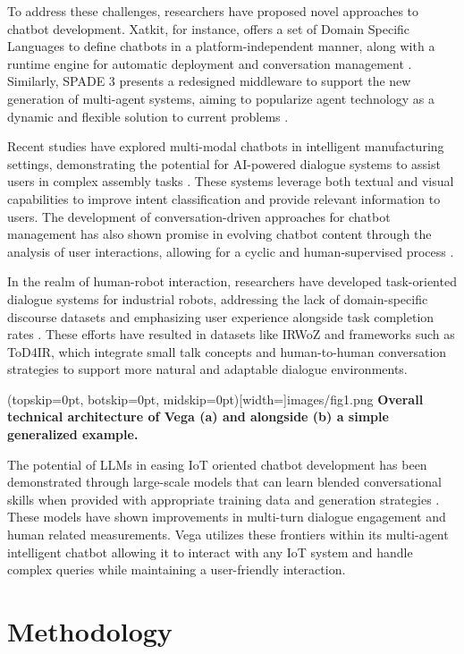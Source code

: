 \documentclass{ieeeaccess}
\begin{document}
To address these challenges, researchers have proposed novel approaches to chatbot development. Xatkit, for instance, offers a set of Domain Specific Languages to define chatbots in a platform-independent manner, along with a runtime engine for automatic deployment and conversation management \cite{8960373}. Similarly, SPADE 3 presents a redesigned middleware to support the new generation of multi-agent systems, aiming to popularize agent technology as a dynamic and flexible solution to current problems \cite{9207929}. 

Recent studies have explored multi-modal chatbots in intelligent manufacturing settings, demonstrating the potential for AI-powered dialogue systems to assist users in complex assembly tasks \cite{9440470}. These systems leverage both textual and visual capabilities to improve intent classification and provide relevant information to users. The development of conversation-driven approaches for chatbot management has also shown promise in evolving chatbot content through the analysis of user interactions, allowing for a cyclic and human-supervised process \cite{9681834}.

In the realm of human-robot interaction, researchers have developed task-oriented dialogue systems for industrial robots, addressing the lack of domain-specific discourse datasets and emphasizing user experience alongside task completion rates \cite{9869659}. These efforts have resulted in datasets like IRWoZ and frameworks such as ToD4IR, which integrate small talk concepts and human-to-human conversation strategies to support more natural and adaptable dialogue environments.

\Figure[t!](topskip=0pt, botskip=0pt,
midskip=0pt)[width=\textwidth]{{images/fig1.png}}
{ \centering \textbf{Overall technical architecture of Vega (a) and alongside (b) a simple generalized example.}\label{fig1}}

The potential of LLMs in easing IoT oriented chatbot development has been demonstrated through large-scale models that can learn blended conversational skills when provided with appropriate training data and generation strategies \cite{roller-etal-2021-recipes}. These models have shown improvements in multi-turn dialogue engagement and human related measurements. Vega utilizes these frontiers within its multi-agent intelligent chatbot allowing it to interact with any IoT system and handle complex queries while maintaining a user-friendly interaction.

\section{Methodology}\label{sec:methodology}
\end{document}
